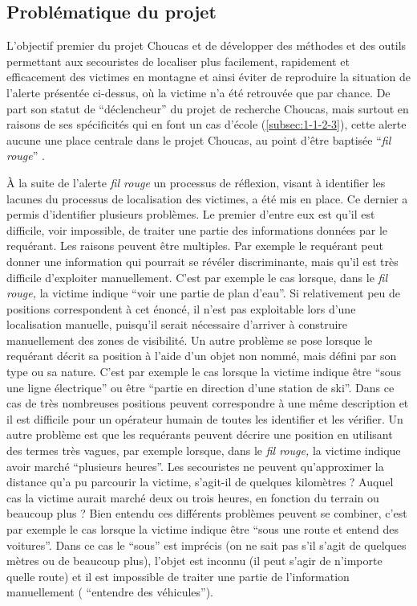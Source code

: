 \subsection{Problématique du projet}
\label{subsec:1-2-2}

L'objectif premier du projet Choucas et de développer des méthodes et
des outils permettant aux secouristes de localiser plus facilement,
rapidement et efficacement des victimes en montagne et ainsi éviter de
reproduire la situation de l'alerte présentée ci-dessus, où la victime
n'a été retrouvée que par chance. De part son statut de
\enquote{déclencheur} du projet de recherche Choucas, mais surtout en
raisons de ses spécificités qui en font un cas d'école
(\autoref{subsec:1-1-2-3}), cette alerte aucune une place centrale
dans le projet Choucas, au point d'être baptisée \enquote{\emph{fil
    rouge}} \autocite{OlteanuRaimond2017}.

À la suite de l'alerte \emph{fil rouge} un processus de réflexion,
visant à identifier les lacunes du processus de localisation des
victimes, a été mis en place. Ce dernier a permis d'identifier
plusieurs problèmes. Le premier d'entre eux est qu'il est difficile,
voir impossible, de traiter une partie des informations données par le
requérant. Les raisons peuvent être multiples. Par exemple le
requérant peut donner une information qui pourrait se révéler
discriminante, mais qu'il est très difficile d'exploiter
manuellement. C'est par exemple le cas lorsque, dans le \emph{fil
  rouge,} la victime indique \enquote{voir une partie de plan
  d'eau}. Si relativement peu de positions correspondent à cet énoncé,
il n'est pas exploitable lors d'une localisation manuelle, puisqu'il
serait nécessaire d'arriver à construire manuellement des zones de
visibilité. Un autre problème se pose lorsque le requérant décrit sa
position à l'aide d'un objet non nommé, mais défini par son type ou sa
nature. C'est par exemple le cas lorsque la victime indique être
\enquote{sous une ligne électrique} ou être \enquote{partie \textelp{}
  en direction d'une station de ski}. Dans ce cas de très nombreuses
positions peuvent correspondre à une même description et il est
difficile pour un opérateur humain de toutes les identifier et les
vérifier. Un autre problème est que les requérants peuvent décrire une
position en utilisant des termes très vagues, par exemple lorsque,
dans le \emph{fil rouge,} la victime indique avoir marché
\enquote{plusieurs heures}. Les secouristes ne peuvent qu'approximer
la distance qu'a pu parcourir la victime, s'agit-il de quelques
kilomètres ? Auquel cas la victime aurait marché deux ou trois heures,
en fonction du terrain ou beaucoup plus ? Bien entendu ces différents
problèmes peuvent se combiner, c'est par exemple le cas lorsque la
victime indique être \enquote{sous une route et entend des
  voitures}. Dans ce cas le \enquote{sous} est imprécis (\ie on ne
sait pas s'il s'agit de quelques mètres ou de beaucoup plus), l'objet
est inconnu (\ie il peut s'agir de n'importe quelle route) et il est
impossible de traiter une partie de l'information manuellement (\ie
\enquote{entendre des véhicules}).

